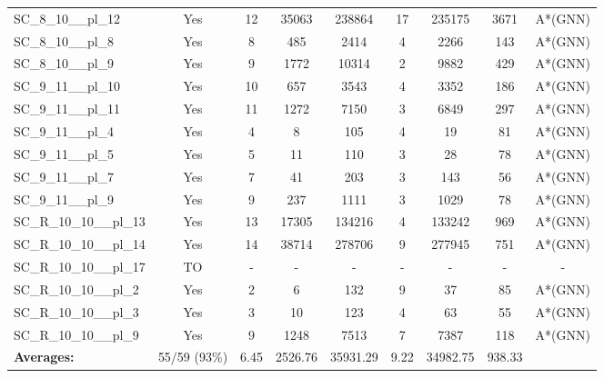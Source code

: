 \documentclass{article}
\begin{document}
\begin{tabular}{lcccccccc}
SC\_8\_10\_\_pl\_12 & Yes & 12 & 35063 & 238864 & 17 & 235175 & 3671 & A*(GNN) \\
SC\_8\_10\_\_pl\_8 & Yes & 8 & 485 & 2414 & 4 & 2266 & 143 & A*(GNN) \\
SC\_8\_10\_\_pl\_9 & Yes & 9 & 1772 & 10314 & 2 & 9882 & 429 & A*(GNN) \\
SC\_9\_11\_\_pl\_10 & Yes & 10 & 657 & 3543 & 4 & 3352 & 186 & A*(GNN) \\
SC\_9\_11\_\_pl\_11 & Yes & 11 & 1272 & 7150 & 3 & 6849 & 297 & A*(GNN) \\
SC\_9\_11\_\_pl\_4 & Yes & 4 & 8 & 105 & 4 & 19 & 81 & A*(GNN) \\
SC\_9\_11\_\_pl\_5 & Yes & 5 & 11 & 110 & 3 & 28 & 78 & A*(GNN) \\
SC\_9\_11\_\_pl\_7 & Yes & 7 & 41 & 203 & 3 & 143 & 56 & A*(GNN) \\
SC\_9\_11\_\_pl\_9 & Yes & 9 & 237 & 1111 & 3 & 1029 & 78 & A*(GNN) \\
SC\_R\_10\_10\_\_pl\_13 & Yes & 13 & 17305 & 134216 & 4 & 133242 & 969 & A*(GNN) \\
SC\_R\_10\_10\_\_pl\_14 & Yes & 14 & 38714 & 278706 & 9 & 277945 & 751 & A*(GNN) \\
SC\_R\_10\_10\_\_pl\_17 & TO & - & - & - & - & - & - & - \\
SC\_R\_10\_10\_\_pl\_2 & Yes & 2 & 6 & 132 & 9 & 37 & 85 & A*(GNN) \\
SC\_R\_10\_10\_\_pl\_3 & Yes & 3 & 10 & 123 & 4 & 63 & 55 & A*(GNN) \\
SC\_R\_10\_10\_\_pl\_9 & Yes & 9 & 1248 & 7513 & 7 & 7387 & 118 & A*(GNN) \\
\textbf{Averages:} & 55/59 (93\%) & 6.45 & 2526.76 & 35931.29 & 9.22 & 34982.75 & 938.33 & \\
\bottomrule
\end{tabular}
\\[0.7cm]
\end{document}
